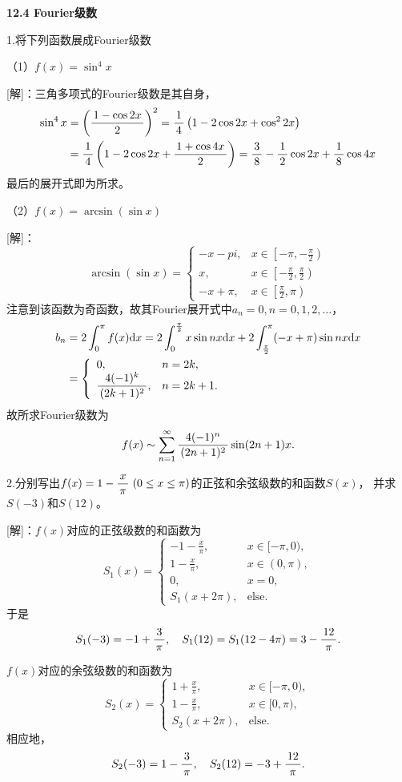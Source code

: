 \begin{center}
	\bf 12.4 Fourier级数
\end{center}

1.将下列函数展成Fourier级数

（1）$f(x)=\sin^4x$

[解]：三角多项式的Fourier级数是其自身，
\begin{align*}
	\sin^4x&=\left(\displaystyle\frac{\,{1-\cos2x}\,}{\,{2}\,}\right)^2
	=\displaystyle\frac{\,{1}\,}{\,{4}\,}\left(1-2\cos2x+\cos^22x\right)\\
	&=\displaystyle\frac{\,{1}\,}{\,{4}\,}\left(1-2\cos2x+\displaystyle\frac{\,{1+\cos4x}\,}{\,{2}\,}\right)
	=\displaystyle\frac{\,{3}\,}{\,{8}\,}-\displaystyle\frac{\,{1}\,}{\,{2}\,}\cos2x+\displaystyle\frac{\,{1}\,}{\,{8}\,}\cos4x
\end{align*}
最后的展开式即为所求。

（2）$f(x)=\arcsin(\sin x)$

[解]：
$$\arcsin(\sin x)=\left\{\begin{array}{ll}
	-x-pi, & x\in\left[-\pi,-\frac{\pi}2\right)\\
	x, & x\in\left[-\frac{\pi}2,\frac{\pi}2\right)\\
	-x+\pi, & x\in\left[\frac{\pi}2,\pi\right)
\end{array}\right.$$
注意到该函数为奇函数，故其Fourier展开式中$a_n=0,n=0,1,2,\ldots$，
\begin{align*}
	b_n&=2\displaystyle\int_0^{\pi}f(x)\mathrm{d} x
	=2\displaystyle\int_0^{\frac{\pi}2}x\sin nx\mathrm{d} x
	+2\displaystyle\int_{\frac{\pi}2}^{\pi}(-x+\pi)\sin nx\mathrm{d} x\\
	&=\left\{\begin{array}{ll}
		0, & n=2k,\\ \displaystyle\frac{\,{4(-1)^k}\,}{\,{(2k+1)^2}\,}, & n=2k+1.
	\end{array}\right.
\end{align*}
故所求Fourier级数为
$$f(x)\sim\sum\limits_{n=1}^{\infty}\displaystyle\frac{\,{4(-1)^n}\,}{\,{(2n+1)^2}\,}\sin(2n+1)x.$$
\fin

\bs

2.分别写出$f(x)=1-\displaystyle\frac{\,{x}\,}{\,{\pi}\,}\;(0\leq x\leq\pi)$的正弦和余弦级数的和函数$S(x)$，
并求$S(-3)$和$S(12)$。

[解]：$f(x)$对应的正弦级数的和函数为
$$S_1(x)=\left\{\begin{array}{ll}
	-1-\frac x{\pi}, & x\in[-\pi,0),\\
	1-\frac x{\pi}, & x\in(0,\pi),\\
	0, & x=0,\\
	S_1(x+2\pi), & \mathrm{else}.
\end{array}\right.$$
于是
$$S_1(-3)=-1+\displaystyle\frac{\,{3}\,}{\,{\pi}\,},\quad
S_1(12)=S_1(12-4\pi)=3-\displaystyle\frac{\,{12}\,}{\,{\pi}\,}.$$

$f(x)$对应的余弦级数的和函数为
$$S_2(x)=\left\{\begin{array}{ll}
	1+\frac x{\pi}, & x\in[-\pi,0),\\
	1-\frac x{\pi}, & x\in[0,\pi),\\
	S_2(x+2\pi), & \mathrm{else}.
\end{array}\right.$$
相应地，
$$S_2(-3)=1-\displaystyle\frac{\,{3}\,}{\,{\pi}\,},\quad
S_2(12)=-3+\displaystyle\frac{\,{12}\,}{\,{\pi}\,}.$$
\fin

